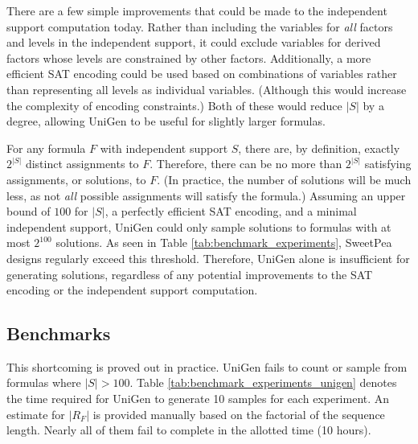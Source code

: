 There are a few simple improvements that could be made to the independent support computation today. Rather than including the variables for \textit{all} factors and levels in the independent support, it could exclude variables for derived factors whose levels are constrained by other factors. Additionally, a more efficient SAT encoding could be used based on combinations of variables rather than representing all levels as individual variables. (Although this would increase the complexity of encoding constraints.) Both of these would reduce $|S|$ by a degree, allowing UniGen to be useful for slightly larger formulas.

For any formula $F$ with independent support $S$, there are, by definition, exactly $2^{|S|}$ distinct assignments to $F$. Therefore, there can be no more than $2^{|S|}$ satisfying assignments, or solutions, to $F$. (In practice, the number of solutions will be much less, as not \textit{all} possible assignments will satisfy the formula.) Assuming an upper bound of $100$ for $|S|$, a perfectly efficient SAT encoding, and a minimal independent support, UniGen could only sample solutions to formulas with at most $2^{100}$ solutions. As seen in Table \ref{tab:benchmark_experiments}, SweetPea designs regularly exceed this threshold. Therefore, UniGen alone is insufficient for generating solutions, regardless of any potential improvements to the SAT encoding or the independent support computation.

\subsection{Benchmarks}

This shortcoming is proved out in practice. UniGen fails to count or sample from formulas where $|S| > 100$. Table \ref{tab:benchmark_experiments_unigen} denotes the time required for UniGen to generate 10 samples for each experiment. An estimate for $|R_F|$ is provided manually based on the factorial of the sequence length. Nearly all of them fail to complete in the allotted time (10 hours).


